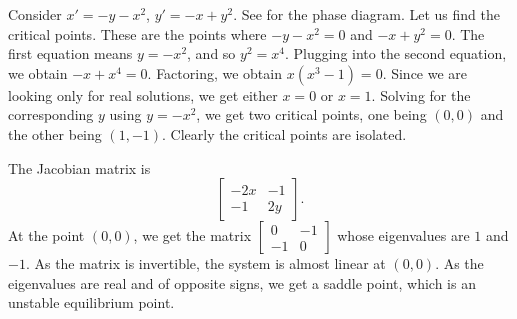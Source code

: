\begin{example} \label{example:nlin-xplusy}
Consider
$x'=-y-x^2$,
$y'=-x+y^2$.
See  for the phase diagram.
Let us find the critical points.  These are the points where
$-y-x^2 = 0$ and $-x+y^2=0$.  The first equation means $y = -x^2$, and
so $y^2 = x^4$.  Plugging into the second equation, we obtain 
$-x+x^4 = 0$.  Factoring, we obtain $x(x^3-1)=0$.  Since we are looking only
for real solutions, we get either $x=0$ or $x=1$.  Solving for the
corresponding $y$ using $y = -x^2$, we get two critical points, one being $(0,0)$
and the other being $(1,-1)$.  Clearly the critical points are isolated.

\begin{myfig}
\capstart
{}
\caption{The phase portrait with a few sample trajectories of 
$x'=-y-x^2$, $y'=-x+y^2$.  \label{fig:nlin-ex813-new}}
\end{myfig}

The Jacobian matrix is
\begin{equation*}
\begin{bmatrix}
-2x & -1 \\
-1 & 2y
\end{bmatrix} .
\end{equation*}
At the point $(0,0)$, we get the matrix
$\left[ \begin{smallmatrix} 0 & -1 \\ -1 & 0 \end{smallmatrix} \right]$
whose eigenvalues are $1$ and $-1$.  As the matrix is invertible, the system is almost linear
at $(0,0)$.  As the eigenvalues are real
and of opposite signs, we get a saddle point, which is an unstable
equilibrium point.


\end{example}
